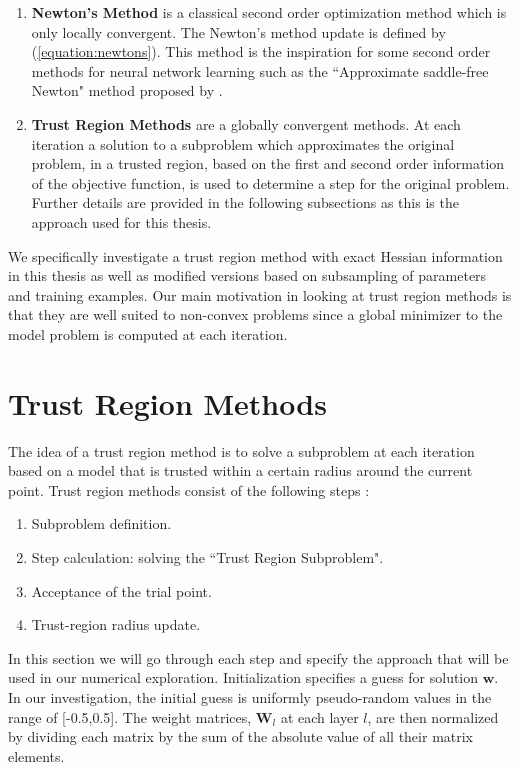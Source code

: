 \documentclass[letterpaper,12pt,titlepage,oneside,final]{book}
\begin{document}
	\begin{enumerate}
		\item{\textbf{Newton's Method} is a classical second order optimization method which is only locally convergent. The Newton's method update is defined by (\ref{equation:newtons}). This method is the inspiration for some  second order methods for neural network learning such as the ``Approximate saddle-free Newton" method proposed by \cite{saddle_free}.}
		\item{\textbf{Trust Region Methods} are a globally convergent methods. At each iteration a solution to a subproblem which approximates the original problem, in a trusted region, based on the first and second order information of the objective function, is used to determine a step for the original problem. Further details are provided in the following subsections as this is the approach used for this thesis. }
	\end{enumerate}
	We specifically investigate a trust region method with exact Hessian information in this thesis as well as modified versions based on subsampling of parameters and training examples. Our main motivation in looking at trust region methods is that they are well suited to non-convex problems since a global minimizer to the model problem is computed at each iteration.
	
	\section{Trust Region Methods}
	The idea of a trust region method is to solve a subproblem at each iteration based on a model that is trusted within a certain radius around the current point. Trust region methods consist of the following steps \cite{TRM.book}:
	\begin{enumerate}
		\item {Subproblem definition.} \label{model def}
		\item {Step calculation: solving the ``Trust Region Subproblem".} \label{step calc}
		\item {Acceptance of the trial point.} \label{accept step}
		\item {Trust-region radius update.} \label{update radius}
	\end{enumerate}
	In this section we will go through each step and specify the approach that will be used in our numerical exploration. Initialization specifies a guess for solution $\mathbf{w}$. In our investigation, the initial guess is uniformly pseudo-random values in the range of [-0.5,0.5]. The weight matrices, $\mathbf{W}_{l}$ at each layer $l$, are then normalized by dividing each matrix by the sum of the absolute value of all their matrix elements. 
	
\end{document}
